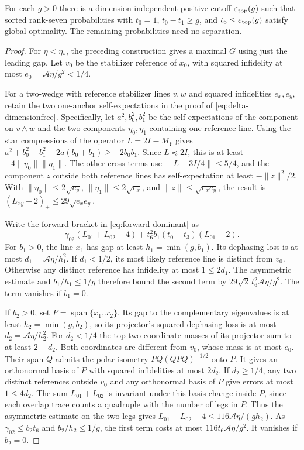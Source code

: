 \begin{theorem}\label{thm:simple-top-boundary}
For each \(g>0\) there is a dimension-independent positive
cutoff \(\varepsilon_{\rm top}(g)\) such that sorted rank-seven
probabilities with \(t_0=1\), \(t_0-t_1\ge g\), and
\(t_6\le\varepsilon_{\rm top}(g)\) satisfy global optimality.
The remaining probabilities need no separation.
\end{theorem}

\begin{proof}
For \(\eta<\eta_*\), the preceding construction gives a maximal
\(G\) using just the leading gap. Let \(v_0\) be the stabilizer
reference of \(x_0\), with squared infidelity at most
\(e_0=\mathcal A\eta/g^2<1/4\).

For a two-wedge with reference stabilizer lines \(v,w\) and
squared infidelities \(e_x,e_y\), retain the two one-anchor
self-expectations in the proof of
\eqref{eq:delta-dimensionfree}. Specifically, let \(a^2,b_0^2,b_1^2\)
be the self-expectations of the component on \(v\wedge w\) and the
two components \(\eta_0,\eta_1\) containing one reference line.
Using the star compressions of the operator \(L=2I-M_Y\) gives
\(a^2+b_0^2+b_1^2-2a(b_0+b_1)\ge-2b_0b_1\).
Since \(L\preceq2I\), this is at least
\(-4\|\eta_0\|\|\eta_1\|\). The other cross terms use
\(\|L-3I/4\|\le5/4\), and the component \(z\) outside both
reference lines has self-expectation at least \(-\|z\|^2/2\).
With \(\|\eta_0\|\le2\sqrt{e_y}\),
\(\|\eta_1\|\le2\sqrt{e_x}\), and \(\|z\|\le\sqrt{e_x e_y}\),
the result is \((L_{xy}-2)_+\le 29\sqrt{e_x e_y}\).

Write the forward bracket in \eqref{eq:forward-dominant} as
\[
 \gamma_{02}(L_{01}+L_{02}-4)
   +t_6^2 b_1(t_0-t_3)(L_{01}-2).
\]
For \(b_1>0\), the line \(x_1\) has gap at least
\(h_1=\min(g,b_1)\). Its dephasing loss is at most
\(d_1=\mathcal A\eta/h_1^2\).
If \(d_1<1/2\), its most likely reference line is distinct
from \(v_0\). Otherwise any distinct reference has
infidelity at most \(1\le2d_1\). The asymmetric estimate and
\(b_1/h_1\le1/g\) therefore bound the second term by
\(29\sqrt2\,t_6^2\mathcal A\eta/g^2\). The term vanishes if \(b_1=0\).

If \(b_2>0\), set \(P=\operatorname{span}\{x_1,x_2\}\).
Its gap to the complementary eigenvalues is at least
\(h_2=\min(g,b_2)\), so its projector's squared dephasing
loss is at most \(d_2=\mathcal A\eta/h_2^2\).
For \(d_2<1/4\) the top two coordinate masses of its
projector sum to at least \(2-d_2\). Both coordinates are
different from \(v_0\), whose mass is at most \(e_0\). Their
span \(Q\) admits the polar isometry \(PQ(QPQ)^{-1/2}\)
onto \(P\). It gives an orthonormal basis of \(P\) with
squared infidelities at most \(2d_2\).
If \(d_2\ge1/4\), any two distinct references outside \(v_0\)
and any orthonormal basis of \(P\) give errors at most
\(1\le4d_2\).
The sum \(L_{01}+L_{02}\) is invariant under this basis
change inside \(P\), since each overlap trace counts a
quadruple with the number of legs in \(P\). Thus the
asymmetric estimate on the two legs gives
\(L_{01}+L_{02}-4\le116\mathcal A\eta/(g h_2)\).
As \(\gamma_{02}\le b_2t_6\) and \(b_2/h_2\le1/g\),
the first term costs at most \(116t_6\mathcal A\eta/g^2\).
It vanishes if \(b_2=0\).


\end{proof}
